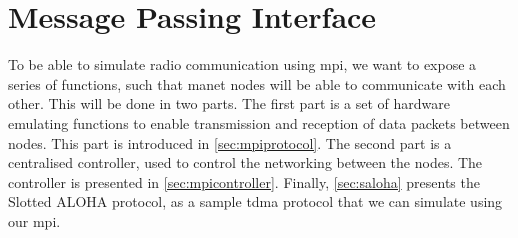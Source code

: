 \chapter{Message Passing Interface}

To be able to simulate radio communication using \gls{mpi}, we want to expose a series of functions, such that \gls{manet} nodes will be able to communicate with each other. This will be done in two parts. The first part is a set of hardware emulating functions to enable transmission and reception of data packets between nodes. This part is introduced in \autoref{sec:mpiprotocol}. The second part is a centralised controller, used to control the networking between the nodes. The controller is presented in \autoref{sec:mpicontroller}. Finally, \autoref{sec:saloha} presents the Slotted ALOHA protocol, as a sample \gls{tdma} protocol that we can simulate using our \gls{mpi}.





